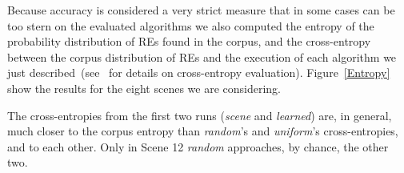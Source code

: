 Because accuracy is considered a very strict measure that in some cases can 
be too stern on the evaluated algorithms we also computed the entropy of the probability distribution of REs found in the corpus, and the cross-entropy between the corpus distribution of REs and the execution of each algorithm we just described~(see~\cite{juraksky:spee08} for details on cross-entropy evaluation). Figure~\ref{Entropy} show the results for the eight scenes we are considering. 



The cross-entropies from the first two runs (\emph{scene} and \emph{learned}) are, in general, much closer to the corpus entropy than \emph{random}'s and \emph{uniform}'s cross-entropies, and to each other.  Only in Scene 12 \emph{random} approaches, by chance, the other two. 
%
